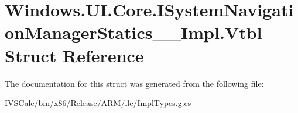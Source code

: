 \hypertarget{struct_windows_1_1_u_i_1_1_core_1_1_i_system_navigation_manager_statics_____impl_1_1_vtbl}{}\section{Windows.\+U\+I.\+Core.\+I\+System\+Navigation\+Manager\+Statics\+\_\+\+\_\+\+Impl.\+Vtbl Struct Reference}
\label{struct_windows_1_1_u_i_1_1_core_1_1_i_system_navigation_manager_statics_____impl_1_1_vtbl}


The documentation for this struct was generated from the following file\+:\begin{DoxyCompactItemize}
\item 
I\+V\+S\+Calc/bin/x86/\+Release/\+A\+R\+M/ilc/Impl\+Types.\+g.\+cs\end{DoxyCompactItemize}
